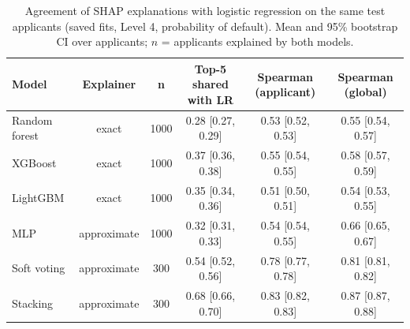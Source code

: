 \begin{table}[t]
\caption{Agreement of SHAP explanations with logistic regression on the same test applicants (saved fits, Level 4, probability of default). Mean and 95\% bootstrap CI over applicants; $n$ = applicants explained by both models.}
\label{tab:rq3_agree}
\centering
\small
\begin{tabular}{lccccc}
\hline
Model & Explainer & n & Top-5 shared with LR & Spearman (applicant) & Spearman (global) \\
\hline
Random forest & exact & 1000 & 0.28 [0.27, 0.29] & 0.53 [0.52, 0.53] & 0.55 [0.54, 0.57] \\
XGBoost & exact & 1000 & 0.37 [0.36, 0.38] & 0.55 [0.54, 0.55] & 0.58 [0.57, 0.59] \\
LightGBM & exact & 1000 & 0.35 [0.34, 0.36] & 0.51 [0.50, 0.51] & 0.54 [0.53, 0.55] \\
MLP & approximate & 1000 & 0.32 [0.31, 0.33] & 0.54 [0.54, 0.55] & 0.66 [0.65, 0.67] \\
Soft voting & approximate & 300 & 0.54 [0.52, 0.56] & 0.78 [0.77, 0.78] & 0.81 [0.81, 0.82] \\
Stacking & approximate & 300 & 0.68 [0.66, 0.70] & 0.83 [0.82, 0.83] & 0.87 [0.87, 0.88] \\
\hline
\end{tabular}
\end{table}
